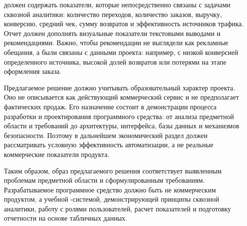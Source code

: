  должен содержать показатели, которые непосредственно связаны с задачами сквозной аналитики: количество переходов, количество заказов, выручку, конверсию, средний чек, сумму возвратов и эффективность источников трафика. Отчет должен дополнять визуальные показатели текстовыми выводами и рекомендациями. Важно, чтобы рекомендации не выглядели как рекламные обещания, а были связаны с данными проекта: например, с низкой конверсией определенного источника, высокой долей возвратов или потерями на этапе оформления заказа.

Предлагаемое решение должно учитывать образовательный характер проекта. Оно не описывается как действующий коммерческий сервис и не предполагает фактических продаж. Его назначение состоит в демонстрации процесса разработки и проектирования программного средства: от анализа предметной области и требований до архитектуры, интерфейса, базы данных и механизмов безопасности. Поэтому в дальнейшем экономический раздел должен рассматривать условную эффективность автоматизации, а не реальные коммерческие показатели продукта.

Таким образом, образ предлагаемого решения соответствует выявленным проблемам предметной области и сформулированным требованиям. Разрабатываемое программное средство должно быть не коммерческим продуктом, а учебной -системой, демонстрирующей принципы сквозной аналитики, работу с ролями пользователей, расчет показателей и подготовку отчетности на основе табличных данных.
